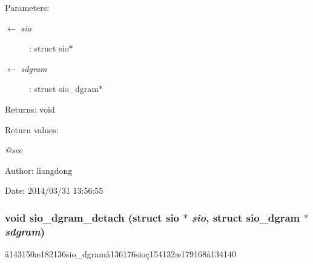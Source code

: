 \begin{Desc}
\item[Parameters:]
\begin{description}
\item[\mbox{$\leftarrow$} {\em sio}]: struct sio$\ast$ \item[\mbox{$\leftarrow$} {\em sdgram}]: struct sio\_\-dgram$\ast$ \end{description}
\end{Desc}
\begin{Desc}
\item[Returns:]void \end{Desc}
\begin{Desc}
\item[Return values:]
\begin{description}
\item[{\em @see}]\end{description}
\end{Desc}
\begin{Desc}
\item[Author:]liangdong \end{Desc}
\begin{Desc}
\item[Date:]2014/03/31 13:56:55 \end{Desc}
\subsubsection{\setlength{\rightskip}{0pt plus 5cm}void sio\_\-dgram\_\-detach (struct sio $\ast$ {\em sio}, struct sio\_\-dgram $\ast$ {\em sdgram})}\label{sio__dgram_8h_a7}


\aa{}143150\ae{}182136sio\_\-dgram\aa{}136176sio\c{c}154132\ae{}179168\aa{}134140 

